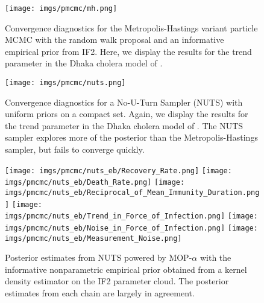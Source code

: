 
\begin{figure}[H]
    \centering
    \texttt{[image: imgs/pmcmc/mh.png]}
    \caption{Convergence diagnostics for the Metropolis-Hastings variant particle MCMC with the random walk proposal and an informative empirical prior from IF2. Here, we display the results for the trend parameter in the Dhaka cholera model of \cite{king08}.}
    \label{fig:mh}
\end{figure}
\FloatBarrier
\newpage

\begin{figure}[H]
    \centering
    \texttt{[image: imgs/pmcmc/nuts.png]}
    \caption{Convergence diagnostics for a No-U-Turn Sampler (NUTS) with uniform priors on a compact set. Again, we display the results for the trend parameter in the Dhaka cholera model of \cite{king08}. The NUTS sampler explores more of the posterior than the Metropolis-Hastings sampler, but fails to converge quickly.}
    \label{fig:nuts}
\end{figure}
\FloatBarrier
\newpage

\begin{figure}[H]
    \centering
    \texttt{[image: imgs/pmcmc/nuts\_eb/Recovery\_Rate.png]}
    \texttt{[image: imgs/pmcmc/nuts\_eb/Death\_Rate.png]}
    \texttt{[image: imgs/pmcmc/nuts\_eb/Reciprocal\_of\_Mean\_Immunity\_Duration.png]}
    \texttt{[image: imgs/pmcmc/nuts\_eb/Trend\_in\_Force\_of\_Infection.png]}
    \texttt{[image: imgs/pmcmc/nuts\_eb/Noise\_in\_Force\_of\_Infection.png]}
    \texttt{[image: imgs/pmcmc/nuts\_eb/Measurement\_Noise.png]}
    \caption{Posterior estimates from NUTS powered by MOP-$\alpha$ with the informative nonparametric empirical prior obtained from a kernel density estimator on the IF2 parameter cloud. The posterior estimates from each chain are largely in agreement.}
    \label{fig:posteriors}
\end{figure}

\FloatBarrier
\newpage